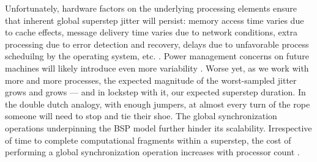 Unfortunately, hardware factors on the underlying processing elements ensure that inherent global superstep jitter will persist: memory access time varies due to cache effects, message delivery time varies due to network conditions, extra processing due to error detection and recovery, delays due to unfavorable process scheduilng by the operating system, etc. \citep{dongarra2014applied}.
Power management concerns on future machines will likely introduce even more variability \citep{gropp2013programming}.
Worse yet, as we work with more and more processes, the expected magnitude of the worst-sampled jitter grows and grows --- and in lockstep with it, our expected superstep duration.
In the double dutch analogy, with enough jumpers, at almost every turn of the rope someone will need to stop and tie their shoe.
The global synchronization operations underpinning the BSP model further hinder its scalability.
Irrespective of time to complete computational fragments within a superstep, the cost of performing a global synchronization operation increases with processor count \citep{dongarra2014applied}.

